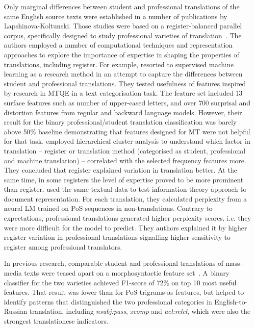 Only marginal differences between student and professional translations of the same English source texts were established in a number of publications by Lapshinova-Koltunski. Those studies were based on a register-balanced parallel corpus, specifically designed to study professional varieties of translation~\cite{Lapshinova2013}. The authors employed a number of computational techniques and representation approaches to explore the importance of expertise in shaping the properties of translations, including register. 
For example, \citet{Rubino2016} resorted to supervised machine learning as a research method in an attempt to capture the differences between student and professional translations. They tested usefulness of features inspired by research in \gls{MTQE} in a text categorisation task. The feature set included 13 surface features such as number of upper-cased letters, and over 700 surprisal and distortion features from regular and backward language models. However, their result for the binary professional/student translation classification was barely above 50\% baseline demonstrating that features designed for MT were not helpful for that task. 
\citet{Lapshinova2017} employed hierarchical cluster analysis to understand which factor in translation -- register or translation method (categorised as student, professional and machine translation) -- correlated with the selected frequency features more. They concluded that register explained variation in translation better. At the same time, in some registers the level of expertise proved to be more prominent than register. 
\citet{Bizzoni2021} used the same textual data to test information theory approach to document representation. For each translation, they calculated perplexity from a neural LM trained on PoS sequences in non-translations. Contrary to expectations, professional translations generated higher perplexity scores, i.e. they were more difficult for the model to predict. They authors explained it by higher register variation in professional translations signalling higher sensitivity to register among professional translators. 

In previous research, comparable student and professional translations of mass-media texts were teased apart on a morphosyntactic feature set~\cite{Kunilovskaya2018ud}. A binary classifier for the two varieties achieved F1-score of 72\% on top 10 most useful features. That result was lower than for PoS trigrams as features, but helped to identify patterns that distinguished the two professional categories in English-to-Russian translation, including \textit{nsubj:pass}, \textit{xcomp} and \textit{acl:relcl}, which were also the strongest translationese indicators.


